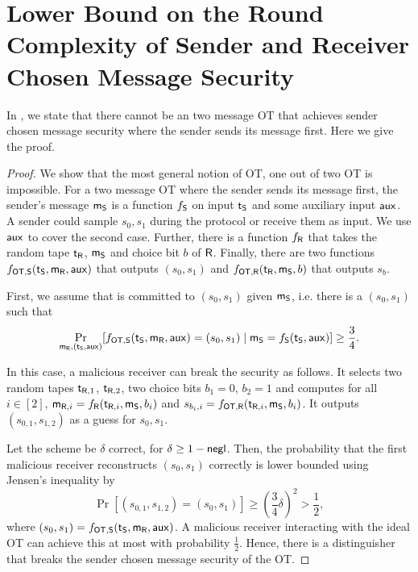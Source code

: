 \section{Lower Bound on the Round Complexity of Sender and Receiver Chosen Message Security}\label{sec:roundcomp}


In , we state that there cannot be an two message OT that achieves sender chosen message security where the sender sends its message first. Here we give the proof. 

\begin{proof}
We show that the most general notion of OT, one out of two OT is impossible.  
For a two message OT where the sender sends its message first, the sender's message $\mathsf{m}_{\mathsf{S}}$ is a function $f_{\mathsf{S}}$ on input $\mathsf{t}_{\mathsf{S}}$ and some auxiliary input $\mathsf{aux}$. A sender could sample $s_0,s_1$ during the protocol or receive them as input. We use $\mathsf{aux}$ to cover the second case. Further, there is a function $f_{\mathsf{R}}$ that takes the random tape $\mathsf{t}_{\mathsf{R}}$, $\mathsf{m}_{\mathsf{S}}$ and choice bit $b$ of $\mathsf{R}$. Finally, there are two functions $f_{\mathsf{OT},\mathsf{S}}(\mathsf{t}_{\mathsf{S}},\mathsf{m}_{\mathsf{R}},\mathsf{aux})$ that outputs $(s_0,s_1)$ and $f_{\mathsf{OT},\mathsf{R}}(\mathsf{t}_{\mathsf{R}},\mathsf{m}_{\mathsf{S}},b)$ that outputs $s_b$. 

First, we assume that \send is committed to $(s_0,s_1)$ given $\mathsf{m}_{\mathsf{S}}$, i.e. there is a $(s_0,s_1)$ such that
$$
\Pr_{\mathsf{m}_{\mathsf{R}}, (\mathsf{t}_{\mathsf{S}},\mathsf{aux})}[f_{\mathsf{OT},\mathsf{S}}(\mathsf{t}_{\mathsf{S}},\mathsf{m}_{\mathsf{R}},\mathsf{aux})=(s_0,s_1)\mid \mathsf{m}_{\mathsf{S}}=f_{\mathsf{S}}(\mathsf{t}_{\mathsf{S}},\mathsf{aux})]\geq\frac{3}{4}.
$$

In this case, a malicious receiver can break the security as follows. It selects two random tapes $\mathsf{t}_{\mathsf{R},1}$, $\mathsf{t}_{\mathsf{R},2}$, two choice bits $b_1=0$, $b_2=1$ and computes for all $i\in[2]$, $\mathsf{m}_{\mathsf{R},i}= f_{\mathsf{R}}(\mathsf{t}_{\mathsf{R},i},\mathsf{m}_{\mathsf{S}},b_i)$ and $s_{b_{i},i}=f_{\mathsf{OT},\mathsf{R}}(\mathsf{t}_{\mathsf{R},i},\mathsf{m}_{\mathsf{S}},b_i)$. It outputs $(s_{0,1},s_{1,2})$ as a guess for $s_0,s_1$.

Let the scheme be $\delta$ correct, for $\delta\geq 1-\mathsf{negl}$. Then, the probability that the first malicious receiver reconstructs $(s_0,s_1)$ correctly is lower bounded using Jensen's inequality by
$$
\Pr[(s_{0,1},s_{1,2})=(s_0,s_1)]\geq \left(\frac{3}{4}\delta\right)^2> \frac{1}{2},
$$
where $(s_0,s_1)=f_{\mathsf{OT},\mathsf{S}}(\mathsf{t}_{\mathsf{S}},\mathsf{m}_{\mathsf{R}},\mathsf{aux})$. A malicious receiver interacting with the ideal OT can achieve this at most with probability $\frac{1}{2}$. Hence, there is a distinguisher that breaks the sender chosen message security of the OT.


\end{proof}
